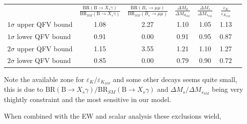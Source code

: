 \begin{table}[H]
\centering
\begin{tabular}{lcccccc}
                           & $\frac{\textrm{BR} ( \textrm{B} \rightarrow X_s \gamma)}{\textrm{BR}_{SM} ( \textrm{B} \rightarrow X_s \gamma )}$ 
                           &  $\frac{ \textrm{BR} (B_s  \longrightarrow  \mu  \mu )}{\textrm{BR}_{SM}(B_s  \longrightarrow  \mu  \mu ) }$  
                           & $\frac{\Delta M_d}{\Delta M_{d_{SM}} }$ 
                           & $\frac{\Delta M_s}{\Delta M_{s_{SM}} }$
                           & $\frac{\varepsilon_K}{\varepsilon_{K_{SM}}}$ \\
$1 \sigma$ upper QFV bound &  1.08    &  2.27   &  1.10     &  1.05     &    1.13    \\
$1 \sigma$ lower QFV bound &  0.91    &  0.00   &  0.91     &  0.95     &    0.87    \\
$2 \sigma$ upper QFV bound &  1.15    &  3.55   &  1.21     &  1.10     &    1.27    \\
$2 \sigma$ lower QFV bound &  0.85    &  0.00   &  0.79     &  0.90     &    0.72           
\end{tabular}
\end{table}

Note the available zone for $\varepsilon_K/\varepsilon_{K_{SM}}$ and some other decays seems quite small, this is due to ${\textrm{BR} ( \textrm{B} \rightarrow X_s \gamma)}/{\textrm{BR}_{SM} ( \textrm{B} \rightarrow X_s \gamma )}$ and ${\Delta M_s}/{\Delta M_{s_{SM}} }$ being very thightly constraint and the most sensitive in our model.

When combined with the EW and scalar analysis these exclusions wield, 

